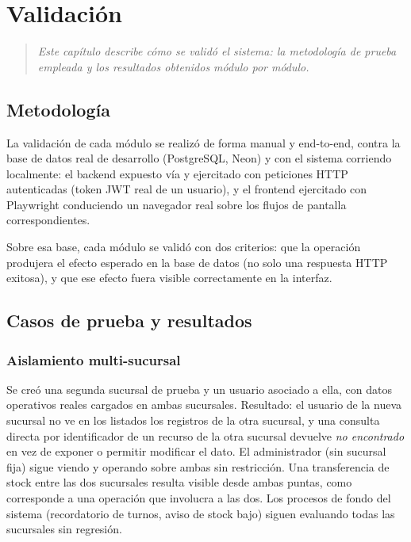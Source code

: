 \chapter{Validación}
\label{sec:validacion}

\begin{quote}
\itshape
Este capítulo describe cómo se validó el sistema: la metodología de prueba empleada y los resultados obtenidos módulo por módulo.
\end{quote}

\section{Metodología}
\label{sec:validacion-metodologia}

La validación de cada módulo se realizó de forma manual y end-to-end, contra la base de datos real de desarrollo (PostgreSQL, Neon) y con el sistema corriendo localmente: el backend expuesto vía  y ejercitado con peticiones HTTP autenticadas (token JWT real de un usuario), y el frontend ejercitado con Playwright conduciendo un navegador real sobre los flujos de pantalla correspondientes.

Sobre esa base, cada módulo se validó con dos criterios: que la operación produjera el efecto esperado en la base de datos (no solo una respuesta HTTP exitosa), y que ese efecto fuera visible correctamente en la interfaz.

\section{Casos de prueba y resultados}
\label{sec:validacion-casos}

\subsection{Aislamiento multi-sucursal}
\label{sec:validacion-sucursal}

Se creó una segunda sucursal de prueba y un usuario asociado a ella, con datos operativos reales cargados en ambas sucursales. Resultado: el usuario de la nueva sucursal no ve en los listados los registros de la otra sucursal, y una consulta directa por identificador de un recurso de la otra sucursal devuelve \emph{no encontrado} en vez de exponer o permitir modificar el dato. El administrador (sin sucursal fija) sigue viendo y operando sobre ambas sin restricción. Una transferencia de stock entre las dos sucursales resulta visible desde ambas puntas, como corresponde a una operación que involucra a las dos. Los procesos de fondo del sistema (recordatorio de turnos, aviso de stock bajo) siguen evaluando todas las sucursales sin regresión.

